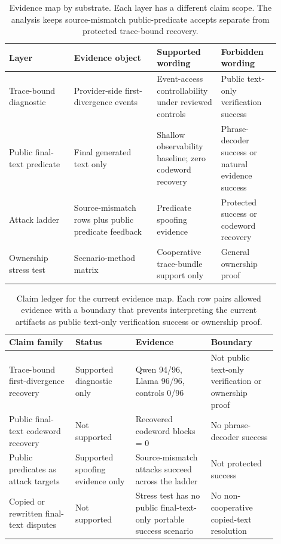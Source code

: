 \begin{table}[t]
\centering
\scriptsize
\setlength{\tabcolsep}{3pt}
\begin{tabular}{p{0.22\linewidth}p{0.28\linewidth}p{0.20\linewidth}p{0.20\linewidth}}
\toprule
Layer & Evidence object & Supported wording & Forbidden wording \\
\midrule
Trace-bound diagnostic & Provider-side first-divergence events & Event-access controllability under reviewed controls & Public text-only verification success \\
Public final-text predicate & Final generated text only & Shallow observability baseline; zero codeword recovery & Phrase-decoder success or natural evidence success \\
Attack ladder & Source-mismatch rows plus public predicate feedback & Predicate spoofing evidence & Protected success or codeword recovery \\
Ownership stress test & Scenario-method matrix & Cooperative trace-bundle support only & General ownership proof \\
\bottomrule
\end{tabular}
\caption{Evidence map by substrate.  Each layer has a different claim scope.
The analysis keeps source-mismatch public-predicate accepts separate from
protected trace-bound recovery.}
\label{tab:evidence-map}
\end{table}

\begin{table}[t]
\centering
\scriptsize
\setlength{\tabcolsep}{3pt}
\renewcommand{\arraystretch}{1.12}
\begin{tabular}{p{0.22\linewidth}p{0.20\linewidth}p{0.25\linewidth}p{0.22\linewidth}}
\toprule
Claim family & Status & Evidence & Boundary \\
\midrule
Trace-bound first-divergence recovery & Supported diagnostic only & Qwen 94/96, Llama 96/96, controls 0/96 & Not public text-only verification or ownership proof \\
Public final-text codeword recovery & Not supported & Recovered codeword blocks = 0 & No phrase-decoder success \\
Public predicates as attack targets & Supported spoofing evidence only & Source-mismatch attacks succeed across the ladder & Not protected success \\
Copied or rewritten final-text disputes & Not supported & Stress test has no public final-text-only portable success scenario & No non-cooperative copied-text resolution \\
\bottomrule
\end{tabular}
\caption{Claim ledger for the current evidence map.  Each row pairs allowed
evidence with a boundary that prevents interpreting the current artifacts as
public text-only verification success or ownership proof.}
\label{tab:claim-ledger}
\end{table}

